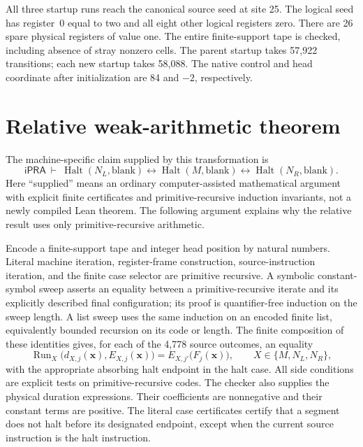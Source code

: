 All three startup runs reach the canonical source seed at site 25.  The
logical seed has register~0 equal to two and all eight other logical registers
zero.  There are 26 spare physical registers of value one.  The entire
finite-support tape is checked, including absence of stray nonzero cells.
The parent startup takes 57,922 transitions; each new startup takes 58,088.
The native control and head coordinate after initialization
are 84 and $-2$, respectively.

\section{Relative weak-arithmetic theorem}

The machine-specific claim supplied by this transformation is
\[
 \mathsf{iPRA}\ \vdash\
 \operatorname{Halt}(N_L,\mathrm{blank})
 \leftrightarrow\operatorname{Halt}(M,\mathrm{blank})
 \leftrightarrow\operatorname{Halt}(N_R,\mathrm{blank}).
\]
Here ``supplied'' means an ordinary computer-assisted mathematical argument
with explicit finite certificates and primitive-recursive induction
invariants, not a newly compiled Lean theorem.  The following argument
explains why the relative result uses only primitive-recursive arithmetic.

Encode a finite-support tape and integer head position by natural numbers.
Literal machine iteration, register-frame construction, source-instruction
iteration, and the finite case selector are primitive recursive.  A symbolic
constant-symbol sweep asserts an equality between a primitive-recursive
iterate and its explicitly described final configuration; its proof is
quantifier-free induction on the sweep length.  A list sweep uses the same
induction on an encoded finite list, equivalently bounded recursion on its
code or length.  The finite composition of these identities gives, for each
of the 4,778 source outcomes, an equality
\[
 \operatorname{Run}_{X}\bigl(d_{X,j}(\mathbf x),E_{X,j}(\mathbf x)\bigr)
   = E_{X,j'}\bigl(F_j(\mathbf x)\bigr),
 \qquad X\in\{M,N_L,N_R\},
\]
with the appropriate absorbing halt endpoint in the halt case.  All side
conditions are explicit tests on primitive-recursive codes.  The checker
also supplies the physical duration expressions.  Their coefficients are
nonnegative and their constant terms are positive.  The literal case
certificates certify that a segment does not halt before its designated
endpoint, except when the current source instruction is the halt
instruction.

